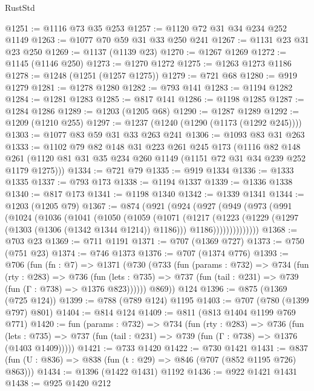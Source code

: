 \begin{lexlean}{RustStd}
\begin{coremodule}
@1251 := @1116 @73 @35 @253
@1257 := @1120 @72 @31 @34 @234 @252 @1149
@1263 := @1077 @70 @59 @31 @33 @250 @241
@1267 := @1131 @23 @31 @23 @250
@1269 := @1137 (@1139 @23)
@1270 := @1267 @1269
@1272 := @1145 (@1146 @250)
@1273 := @1270 @1272
@1275 := @1263 @1273 @1186
@1278 := @1248 (@1251 (@1257 @1275))
@1279 := @721 @68
@1280 := @919 @1279
@1281 := @1278 @1280
@1282 := @793 @141
@1283 := @1194 @1282
@1284 := @1281 @1283
@1285 := @817 @141
@1286 := @1198 @1285
@1287 := @1284 @1286
@1289 := @1203 (@1205 @68)
@1290 := @1287 @1289
@1292 := @1209 (@1210 @255)
@1297 := @1237 (@1240 (@1290 (@1173 (@1292 @245))))
@1303 := @1077 @83 @59 @31 @33 @263 @241
@1306 := @1093 @83 @31 @263
@1333 := @1102
    @79
    @82
    @148
    @31
    @223
    @261
    @245
    @173
    (@1116
      @82
      @148
      @261
      (@1120 @81 @31 @35 @234 @260 @1149 (@1151 @72 @31 @34 @239 @252 @1179 @1275)))
@1334 := @721 @79
@1335 := @919 @1334
@1336 := @1333 @1335
@1337 := @793 @173
@1338 := @1194 @1337
@1339 := @1336 @1338
@1340 := @817 @173
@1341 := @1198 @1340
@1342 := @1339 @1341
@1344 := @1203 (@1205 @79)
@1367 := @874
    (@921
      (@924
        (@927
          (@949
            (@973
              (@991
                (@1024
                  (@1036
                    (@1041
                      (@1050
                        (@1059
                          (@1071
                            (@1217
                              (@1223
                                (@1229 (@1297 (@1303 (@1306 (@1342 @1344 @1214)) @1186)))
                                @1186))))))))))))))
@1368 := @703 @23
@1369 := @711 @1191
@1371 := @707 (@1369 @727)
@1373 := @750 (@751 @23)
@1374 := @746 @1373
@1376 := @707 (@1374 @776)
@1393 := @706
    (fun (fn : @7) =>
    @1371
      (@730
        (@733
          (fun (params : @732) =>
          @734
            (fun (rty : @283) =>
            @736
              (fun (lets : @735) =>
              @737 (fun (tail : @231) => @739 (fun (Γ : @738) => @1376 @823))))))
        @869))
    @124
@1396 := @875 (@1369 (@725 @124))
@1399 := @788 (@789 @124) @1195
@1403 := @707 (@780 (@1399 @797) @801)
@1404 := @814 @124
@1409 := @811 (@813 @1404 @1199 @769 @771)
@1420 := fun (params : @732) =>
  @734
    (fun (rty : @283) =>
    @736
      (fun (lets : @735) =>
      @737 (fun (tail : @231) => @739 (fun (Γ : @738) => @1376 (@1403 @1409)))))
@1421 := @733 @1420
@1422 := @730 @1421
@1431 := @837 (fun (U : @836) => @838 (fun (t : @29) => @846 (@707 (@852 @1195 @726) @863)))
@1434 := @1396 (@1422 @1431) @1192
@1436 := @922 @1421 @1431
@1438 := @925 @1420 @212

\end{coremodule}
\end{lexlean}
